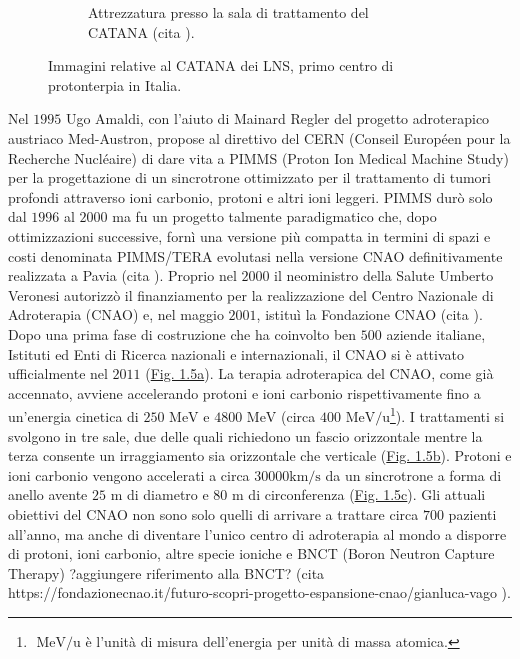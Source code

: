 \documentclass[12pt,a4paper,twoside]{report}
\begin{document}
\begin{figure}[H]
\begin{subfigure}[b]{0.49\textwidth}
			\caption{Attrezzatura presso la sala di trattamento del CATANA (cita
				).}
			\label{fig:catana2}
		\end{subfigure}
		\caption{Immagini relative al CATANA dei LNS, primo centro di protonterpia in Italia.}
		\label{fig:catana}
	\end{figure}
	
	Nel $1995$ Ugo Amaldi, con l'aiuto di Mainard Regler del progetto adroterapico austriaco Med-Austron, propose al direttivo del CERN (Conseil Européen pour la Recherche Nucléaire) di dare vita a PIMMS (Proton Ion Medical Machine Study) per la progettazione di un sincrotrone ottimizzato per il trattamento di tumori profondi attraverso ioni carbonio, protoni e altri ioni leggeri. PIMMS durò solo dal $1996$ al $2000$ ma fu un progetto talmente paradigmatico che, dopo ottimizzazioni successive, fornì una versione più compatta in termini di spazi e costi denominata PIMMS/TERA evolutasi nella versione CNAO definitivamente realizzata a Pavia (cita
	). Proprio nel $2000$ il neoministro della Salute Umberto Veronesi autorizzò il finanziamento per la realizzazione del Centro Nazionale di Adroterapia (CNAO) e, nel maggio $2001$, istituì la Fondazione CNAO (cita
	). Dopo una prima fase di costruzione che ha coinvolto ben $500$ aziende italiane, Istituti ed Enti di Ricerca nazionali e internazionali, il CNAO si è attivato ufficialmente nel $2011$ (\hyperref[fig:edificio_cnao]{Fig. 1.5a}). La terapia adroterapica del CNAO, come già accennato, avviene accelerando protoni e ioni carbonio rispettivamente fino a un'energia cinetica di $250 \mbox{ MeV}$ e $4800\mbox{ MeV}$ (circa $400\mbox{ MeV/u}$\footnote{$\mbox{ MeV/u}$ è l'unità di misura dell'energia per unità di massa atomica.}). I trattamenti si svolgono in tre sale, due delle quali richiedono un fascio orizzontale mentre la terza consente un irraggiamento sia orizzontale che verticale (\hyperref[fig:sala_cnao]{Fig. 1.5b}). Protoni e ioni carbonio vengono accelerati a circa $30000\mbox{km/s}$ da un sincrotrone a forma di anello avente $25\mbox{ m}$ di diametro e $80\mbox{ m}$ di circonferenza (\hyperref[fig:sincrotrone_cnao]{Fig. 1.5c}). Gli attuali obiettivi del CNAO non sono solo quelli di arrivare a trattare circa $700$ pazienti all’anno, ma anche di diventare l’unico centro di adroterapia al mondo a disporre di protoni, ioni carbonio, altre specie ioniche e BNCT (Boron Neutron Capture Therapy) ?aggiungere riferimento alla BNCT? (cita
	https://fondazionecnao.it/futuro-scopri-progetto-espansione-cnao/gianluca-vago
	).
	
\end{document}
